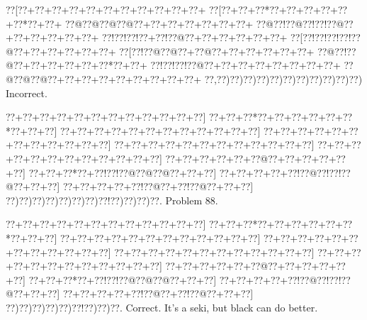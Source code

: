 \documentclass[a5paper]{article}
\begin{document}
\begin{center}
{\goo
\0??[\0??+\0??+\0??+\0??+\0??+\0??+\0??+\0??+\0??+\0??+\0??+
\0??[\0??+\0??+\0??*\0??+\0??+\0??+\0??+\0??+\0??*\0??+\0??+
\0??@\0??@\0??@\0??@\0??+\0??+\0??+\0??+\0??+\0??+\0??+
\0??@\0??!\0??@\0??!\0??!\0??@\0??+\0??+\0??+\0??+\0??+\0??+
\0??!\0??!\0??!\0??+\0??!\0??@\0??+\0??+\0??+\0??+\0??+\0??+
\0??[\0??!\0??!\0??!\0??!\0??@\0??+\0??+\0??+\0??+\0??+\0??+
\0??[\0??!\0??@\0??@\0??+\0??@\0??+\0??+\0??+\0??+\0??+\0??+
\0??@\0??!\0??@\0??+\0??+\0??+\0??+\0??+\0??*\0??+\0??+
\0??!\0??!\0??!\0??@\0??+\0??+\0??+\0??+\0??+\0??+\0??+\0??+
\0??@\0??@\0??@\0??+\0??+\0??+\0??+\0??+\0??+\0??+\0??+\0??+
\0??,\0??)\0??)\0??)\0??)\0??)\0??)\0??)\0??)\0??)\0??)\0??)
}
Incorrect. 

\end{center}
\newpage
\begin{center}
{\goo
\0??+\0??+\0??+\0??+\0??+\0??+\0??+\0??+\0??+\0??+\0??+\0??]
\0??+\0??+\0??*\0??+\0??+\0??+\0??+\0??+\0??*\0??+\0??+\0??]
\0??+\0??+\0??+\0??+\0??+\0??+\0??+\0??+\0??+\0??+\0??+\0??]
\0??+\0??+\0??+\0??+\0??+\0??+\0??+\0??+\0??+\0??+\0??+\0??]
\0??+\0??+\0??+\0??+\0??+\0??+\0??+\0??+\0??+\0??+\0??+\0??]
\0??+\0??+\0??+\0??+\0??+\0??+\0??+\0??+\0??+\0??+\0??+\0??]
\0??+\0??+\0??+\0??+\0??+\0??@\0??+\0??+\0??+\0??+\0??+\0??]
\0??+\0??+\0??*\0??+\0??!\0??!\0??@\0??@\0??@\0??+\0??+\0??]
\0??+\0??+\0??+\0??+\0??!\0??@\0??!\0??!\0??@\0??+\0??+\0??]
\0??+\0??+\0??+\0??+\0??!\0??@\0??+\0??!\0??@\0??+\0??+\0??]
\0??)\0??)\0??)\0??)\0??)\0??)\0??)\0??!\0??)\0??)\0??)\0??.
}
Problem 88.

\end{center}
\begin{center}
{\goo
\0??+\0??+\0??+\0??+\0??+\0??+\0??+\0??+\0??+\0??+\0??+\0??]
\0??+\0??+\0??*\0??+\0??+\0??+\0??+\0??+\0??*\0??+\0??+\0??]
\0??+\0??+\0??+\0??+\0??+\0??+\0??+\0??+\0??+\0??+\0??+\0??]
\0??+\0??+\0??+\0??+\0??+\0??+\0??+\0??+\0??+\0??+\0??+\0??]
\0??+\0??+\0??+\0??+\0??+\0??+\0??+\0??+\0??+\0??+\0??+\0??]
\0??+\0??+\0??+\0??+\0??+\0??+\0??+\0??+\0??+\0??+\0??+\0??]
\0??+\0??+\0??+\0??+\0??+\0??@\0??+\0??+\0??+\0??+\0??+\0??]
\0??+\0??+\0??*\0??+\0??!\0??!\0??@\0??@\0??@\0??+\0??+\0??]
\0??+\0??+\0??+\0??+\0??!\0??@\0??!\0??!\0??@\0??+\0??+\0??]
\0??+\0??+\0??+\0??+\0??!\0??@\0??+\0??!\0??@\0??+\0??+\0??]
\0??)\0??)\0??)\0??)\0??)\0??!\0??)\0??)\0??.
}
Correct. It's a seki, but black can do better.

\end{center}
\end{document}

